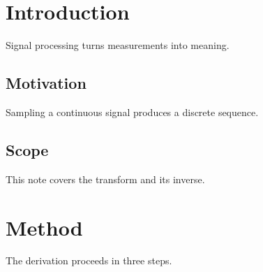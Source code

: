 \documentclass{article}
\begin{document}
\section{Introduction}
Signal processing turns measurements into meaning.

\subsection{Motivation}
Sampling a continuous signal produces a discrete sequence.

\subsection{Scope}
This note covers the transform and its inverse.

\section{Method}
The derivation proceeds in three steps.
\end{document}
